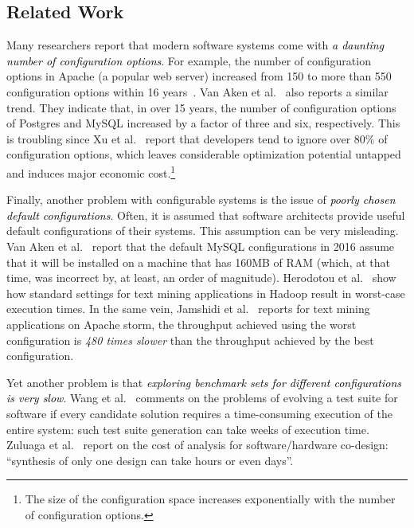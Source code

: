 \subsection{Related Work}
Many researchers report that modern software systems come with \textcolor{black}{{\em a daunting number of configuration options}}. 
For example, the number of configuration options in Apache (a popular web server) increased from 150 to more than 550 configuration options within 16 years~\cite{xu2015hey}. 
Van Aken et al.~\cite{van2017automatic} also reports a similar trend. They indicate that, in over 15 years, the number of configuration options of {\sc Postgres} and {\sc MySQL} increased by a factor of three and six, respectively.
This is troubling since
Xu et al.~\cite{xu2015hey} report that developers tend to ignore over 80\% of configuration options, which leaves considerable optimization potential untapped and induces major economic cost.\footnote{The size of the configuration space increases exponentially  with the number of configuration options.} 



Finally, another problem  with configurable
systems is the issue of  \textcolor{black}{{\em poorly chosen default configurations}}.
Often, it is assumed that software architects provide useful default configurations of their systems.  This assumption can be very
misleading.   Van Aken et al.~\cite{van2017automatic} report that the default MySQL configurations in 2016 assume that it will be installed on a machine that has  160MB of RAM (which, at that
time, was incorrect by, at least, an order of magnitude). Herodotou et al.~\cite{herodotou2011starfish} show how standard settings for text mining
applications in Hadoop result in worst-case execution times.
In the same vein,  
Jamshidi et al.~\cite{jamshidi2016uncertainty} reports for
 text mining applications on Apache storm, the throughput achieved using the worst configuration is 
{\em 480 times slower} than the throughput achieved by the best configuration.

Yet another  problem
is that 
\textcolor{black}{{\em  exploring benchmark sets for different configurations is very slow}}. 
Wang et al.~\cite{wang2013searching} comments on the problems of evolving a test suite for software if every candidate solution requires a time-consuming execution of the entire system: such test suite generation can take weeks of execution time.
Zuluaga et al.~\cite{zuluaga2013active} report on the cost of analysis for software/hardware co-design: ``synthesis of only one design can take hours or even days''. 


